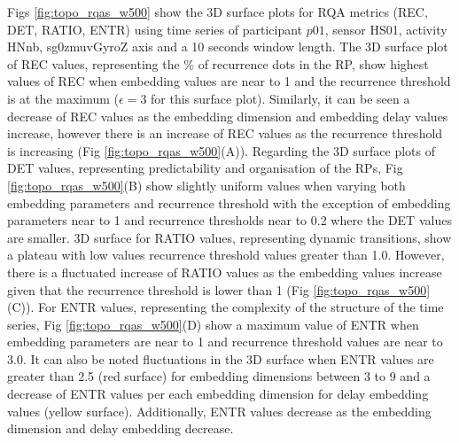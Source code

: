 Figs \ref{fig:topo_rqas_w500} show the 3D surface plots for RQA metrics 
(REC, DET, RATIO, ENTR) using time series of participant $p01$, 
sensor HS01, activity HNnb, sg0zmuvGyroZ axis and a 10 
seconds window length.
The 3D surface plot of REC values, representing the \% of recurrence dots 
in the RP, show highest values of REC when embedding values 
are near to 1 and the recurrence threshold is at the maximum 
($\epsilon = 3$ for this surface plot). Similarly, it can be seen a decrease
of REC values as the embedding dimension and embedding delay values 
increase, however there is an increase of REC values as the recurrence 
threshold is increasing (Fig \ref{fig:topo_rqas_w500}(A)).
Regarding the 3D surface plots of DET values, representing predictability 
and organisation of the RPs, Fig \ref{fig:topo_rqas_w500}(B) show slightly 
uniform values when varying both embedding parameters and recurrence 
threshold with the exception of embedding parameters near to 1 and 
recurrence thresholds near to 0.2 where the DET values are smaller.
3D surface for RATIO values, representing dynamic transitions, show 
a plateau with low values recurrence threshold values greater than 1.0.
However, there is a fluctuated increase of RATIO values as the embedding 
values increase given that the recurrence threshold is lower 
than 1 (Fig \ref{fig:topo_rqas_w500}(C)).
For ENTR values, representing the complexity of the structure of the 
time series, Fig \ref{fig:topo_rqas_w500}(D) show a maximum value of 
ENTR when embedding parameters are near to 1 and recurrence threshold values
are near to 3.0. It can also be noted fluctuations in the 3D surface 
when ENTR values are greater than 2.5 (red surface) for embedding 
dimensions between 3 to 9 and a decrease of ENTR values per each 
embedding dimension for delay embedding values (yellow surface).
Additionally, ENTR values decrease as the embedding dimension and 
delay embedding decrease.
